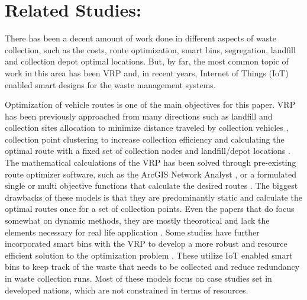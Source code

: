 \documentclass[12pt]{article}
\begin{document}
\section{Related Studies:}

There has been a decent amount of work done in different aspects of waste collection, such as the costs, route optimization, smart bins, segregation, landfill and collection depot optimal locations. But, by far, the most common topic of work in this area has been VRP and, in recent years, Internet of Things (IoT) enabled smart designs for the waste management systems. 

Optimization of vehicle routes is one of the main objectives for this paper. VRP has been previously approached from many directions such as landfill and collection sites allocation to minimize distance traveled by collection vehicles \cite{kulcar1996optimizing,rathore2020location,barzehkar2019landfill}, collection point clustering to increase collection efficiency \cite{al2021optimization} and calculating the optimal route with a fixed set of collection nodes and landfill/depot locations \cite{karadimas2008routing, amal2018sga, asefi2019mathematical,de2007decision, hannan2020waste,akhtar2017backtracking}. The mathematical calculations of the VRP has been solved through pre-existing route optimizer software, such as the ArcGIS Network Analyst \cite{karadimas2008routing,amal2018sga, malakahmad2014solid}, or a formulated single or multi objective functions that calculate the desired routes \cite{hannan2020waste,de2007decision}. The biggest drawbacks of these models is that they are predominantly static and calculate the optimal routes once for a set of collection points. Even the papers that do focus somewhat on dynamic methods, they are mostly theorotical and lack the elements necessary for real life application \cite{hannan2020waste}. Some studies have further incorporated smart bins with the VRP to develop a more robust and resource efficient solution to the optimization problem \cite{akhtar2017backtracking,lozano2018smart,baldo2021multi}. These utilize IoT enabled smart bins to keep track of the waste that needs to be collected and reduce redundancy in waste collection runs. Most of these models focus on case studies set in developed nations, which are not constrained in terms of resources.
\end{document}
